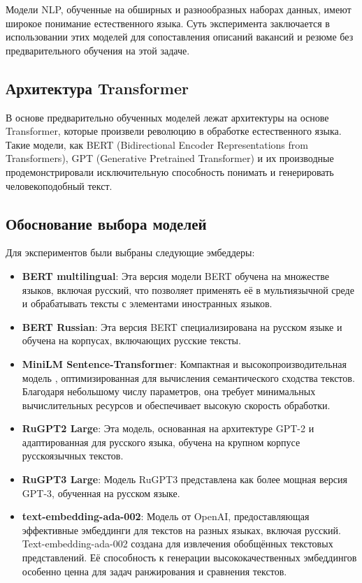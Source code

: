 \documentclass{article}
\begin{document}
Модели NLP, обученные на обширных и разнообразных наборах данных, имеют широкое понимание естественного языка. Суть эксперимента заключается в использовании этих моделей для сопоставления описаний вакансий и резюме без предварительного обучения на этой задаче. 

\subsection{Архитектура Transformer}

В основе предварительно обученных моделей лежат архитектуры на основе Transformer, которые произвели революцию в обработке естественного языка. Такие модели, как BERT (Bidirectional Encoder Representations from Transformers), GPT (Generative Pretrained Transformer) и их производные продемонстрировали исключительную способность понимать и генерировать человекоподобный текст. 

\subsection{Обоснование выбора моделей}

Для экспериментов были выбраны следующие эмбеддеры:

\begin{itemize} 
\item \textbf{BERT multilingual}: Эта версия модели BERT обучена на множестве языков, включая русский, что позволяет применять её в мультиязычной среде и обрабатывать тексты с элементами иностранных языков.

\item \textbf{BERT Russian}: Эта версия BERT специализирована на русском языке и обучена на корпусах, включающих русские тексты. 

\item \textbf{MiniLM Sentence-Transformer}: Компактная и высокопроизводительная модель \cite{wang2020minilmdeepselfattentiondistillation}, оптимизированная для вычисления семантического сходства текстов. Благодаря небольшому числу параметров, она требует минимальных вычислительных ресурсов и обеспечивает высокую скорость обработки.

\item \textbf{RuGPT2 Large}: Эта модель, основанная на архитектуре GPT-2 и адаптированная для русского языка, обучена на крупном корпусе русскоязычных текстов. 

\item \textbf{RuGPT3 Large}: Модель RuGPT3 представлена как более мощная версия GPT-3, обученная на русском языке.

\item \textbf{text-embedding-ada-002}: Модель от OpenAI, предоставляющая эффективные эмбеддинги для текстов на разных языках, включая русский. Text-embedding-ada-002 создана для извлечения обобщённых текстовых представлений. Её способность к генерации высококачественных эмбеддингов особенно ценна для задач ранжирования и сравнения текстов.
\end{itemize}
\end{document}
